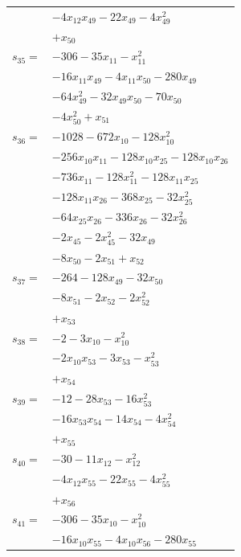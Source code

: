 \begin{longtable}{@{}r@{\;}l@{}}
 & \(\displaystyle -4x_{12}x_{49} -22x_{49} -4x_{49}^{2}\) \\
 & \(\displaystyle +x_{50}\) \\[3pt]
\(s_{35}=\) & \(\displaystyle -306 -35x_{11} -x_{11}^{2}\) \\
 & \(\displaystyle -16x_{11}x_{49} -4x_{11}x_{50} -280x_{49}\) \\
 & \(\displaystyle -64x_{49}^{2} -32x_{49}x_{50} -70x_{50}\) \\
 & \(\displaystyle -4x_{50}^{2} +x_{51}\) \\[3pt]
\(s_{36}=\) & \(\displaystyle -1028 -672x_{10} -128x_{10}^{2}\) \\
 & \(\displaystyle -256x_{10}x_{11} -128x_{10}x_{25} -128x_{10}x_{26}\) \\
 & \(\displaystyle -736x_{11} -128x_{11}^{2} -128x_{11}x_{25}\) \\
 & \(\displaystyle -128x_{11}x_{26} -368x_{25} -32x_{25}^{2}\) \\
 & \(\displaystyle -64x_{25}x_{26} -336x_{26} -32x_{26}^{2}\) \\
 & \(\displaystyle -2x_{45} -2x_{45}^{2} -32x_{49}\) \\
 & \(\displaystyle -8x_{50} -2x_{51} +x_{52}\) \\[3pt]
\(s_{37}=\) & \(\displaystyle -264 -128x_{49} -32x_{50}\) \\
 & \(\displaystyle -8x_{51} -2x_{52} -2x_{52}^{2}\) \\
 & \(\displaystyle +x_{53}\) \\[3pt]
\(s_{38}=\) & \(\displaystyle -2 -3x_{10} -x_{10}^{2}\) \\
 & \(\displaystyle -2x_{10}x_{53} -3x_{53} -x_{53}^{2}\) \\
 & \(\displaystyle +x_{54}\) \\[3pt]
\(s_{39}=\) & \(\displaystyle -12 -28x_{53} -16x_{53}^{2}\) \\
 & \(\displaystyle -16x_{53}x_{54} -14x_{54} -4x_{54}^{2}\) \\
 & \(\displaystyle +x_{55}\) \\[3pt]
\(s_{40}=\) & \(\displaystyle -30 -11x_{12} -x_{12}^{2}\) \\
 & \(\displaystyle -4x_{12}x_{55} -22x_{55} -4x_{55}^{2}\) \\
 & \(\displaystyle +x_{56}\) \\[3pt]
\(s_{41}=\) & \(\displaystyle -306 -35x_{10} -x_{10}^{2}\) \\
 & \(\displaystyle -16x_{10}x_{55} -4x_{10}x_{56} -280x_{55}\) \\

\end{longtable}
